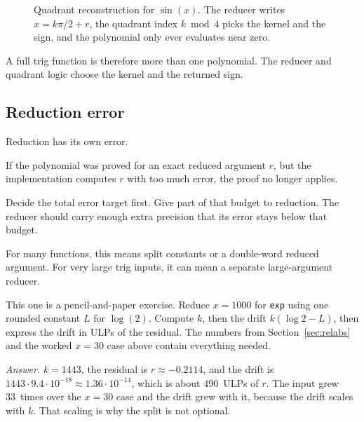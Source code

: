 \documentclass[manuscript, nonacm]{acmart}
\begin{document}
  \begin{figure}[tbp]
    \centering
    \caption{Quadrant reconstruction for $\sin(x)$. The reducer writes
      $x = k\pi/2 + r$, the quadrant index $k \bmod 4$ picks the kernel and
      the sign, and the polynomial only ever evaluates near zero.}
    \label{fig:quadrants}
  \end{figure}

  A full trig function is therefore more than one polynomial. The reducer and
  quadrant logic choose the kernel and the returned sign.

  \subsection{Reduction error}

  Reduction has its own error.

  If the polynomial was proved for an exact reduced argument $r$, but the
  implementation computes $r$ with too much error, the proof no longer applies.

  Decide the total error target first. Give part of that budget to reduction.
  The reducer should carry enough extra precision that its error stays below
  that budget.

  For many functions, this means split constants or a double-word reduced
  argument. For very large trig inputs, it can mean a separate large-argument
  reducer.

  \begin{checkpoint}
    This one is a pencil-and-paper exercise. Reduce $x = 1000$ for
    \texttt{exp} using one rounded constant $L$ for $\log(2)$. Compute $k$,
    then the drift $k(\log 2 - L)$, then express the drift in ULPs of the
    residual. The numbers from Section~\ref{sec:relabs} and the worked
    $x = 30$ case above contain everything needed.

    \emph{Answer.}  $k = 1443$, the residual is $r \approx -0.2114$, and the
    drift is $1443 \cdot 9.4 \cdot 10^{-18} \approx 1.36 \cdot 10^{-14}$,
    which is about 490~ULPs of $r$. The input grew 33~times over the
    $x = 30$ case and the drift grew with it, because the drift scales with
    $k$. That scaling is why the split is not optional.
  \end{checkpoint}
\end{document}
